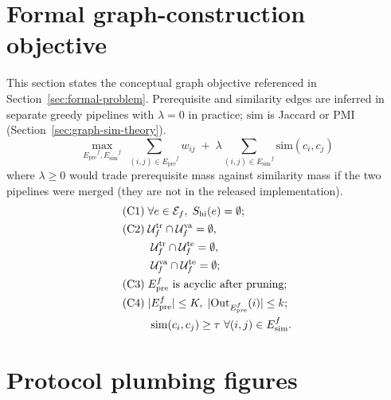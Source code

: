 \documentclass[pdflatex,sn-mathphys-num]{sn-jnl}
\newcommand{\Epre}{\ensuremath{E_{\text{pre}}}}
\newcommand{\Esim}{\ensuremath{E_{\text{sim}}}}
\begin{document}
\section{Formal graph-construction objective}
\label{sec:supp-graph-objective}
\noindent This section states the conceptual graph objective referenced in
Section~\ref{sec:formal-problem}. Prerequisite and similarity edges are inferred
in separate greedy pipelines with $\lambda{=}0$ in practice; $\mathrm{sim}$ is
Jaccard or PMI (Section~\ref{sec:graph-sim-theory}).
\begin{equation}
\max_{\Epre^f,\Esim^f}\;
\sum_{(i,j)\in\Epre^f} w_{ij}
\;+\;
\lambda \sum_{(i,j)\in\Esim^f} \mathrm{sim}(c_i,c_j)
\label{eq:graph-objective}
\end{equation}
where $\lambda\ge 0$ would trade prerequisite mass against similarity mass if the
two pipelines were merged (they are not in the released implementation).
\begin{align}
\text{(C1)} \;& \forall e\in\mathcal{E}_f,\;
  S_{\mathrm{hi}}(e)=\emptyset;
  \label{eq:c1}\\
\text{(C2)} \;& \mathcal{U}^{\mathrm{tr}}_f \cap \mathcal{U}^{\mathrm{va}}_f
  = \emptyset,\notag\\
&\; \mathcal{U}^{\mathrm{tr}}_f \cap \mathcal{U}^{\mathrm{te}}_f
  = \emptyset,\notag\\
&\; \mathcal{U}^{\mathrm{va}}_f \cap \mathcal{U}^{\mathrm{te}}_f
  = \emptyset;
  \label{eq:c2}\\
\text{(C3)} \;& \Epre^f \text{ is acyclic after pruning};
  \label{eq:c3}\\
\text{(C4)} \;& |\Epre^f|\le K,\;
  |\mathrm{Out}_{\Epre^f}(i)|\le k;\notag\\
&\; \mathrm{sim}(c_i,c_j)\ge\tau \ \forall (i,j)\in\Esim^f.
  \label{eq:c4}
\end{align}

\section{Protocol plumbing figures}
\label{sec:supp-protocol-figures}
\end{document}
